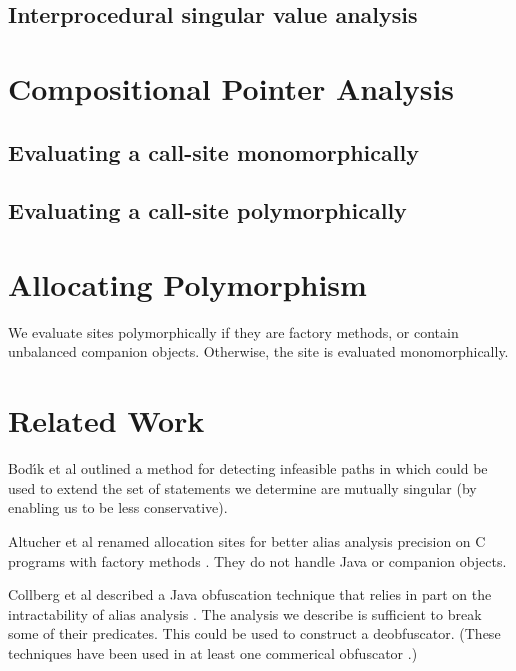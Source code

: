 \documentclass[11pt,notitlepage]{article}
\begin{document}
\subsection{Interprocedural singular value analysis}

\section{Compositional Pointer Analysis}

\subsection{Evaluating a call-site monomorphically}
\subsection{Evaluating a call-site polymorphically}

\section{Allocating Polymorphism}

We evaluate sites polymorphically if they are factory methods, or
contain unbalanced companion objects.  Otherwise, the site is
evaluated monomorphically.

\section{Related Work}

Bod{\'\i}k et al outlined a method for detecting infeasible paths
in \cite{267921} which could be used to extend the set of statements
we determine are mutually singular (by enabling us to be less conservative).

Altucher et al renamed allocation sites for better alias analysis
precision on C programs with factory methods \cite{199466}.  They
do not handle Java or companion objects.

Collberg et al described a Java obfuscation technique that relies in
part on the intractability of alias analysis \cite{268962}.  The
analysis we describe is sufficient to break some of their predicates.
This could be used to construct a deobfuscator.  (These techniques
have been used in at least one commerical obfuscator \cite{humper02}.)



\end{document}
